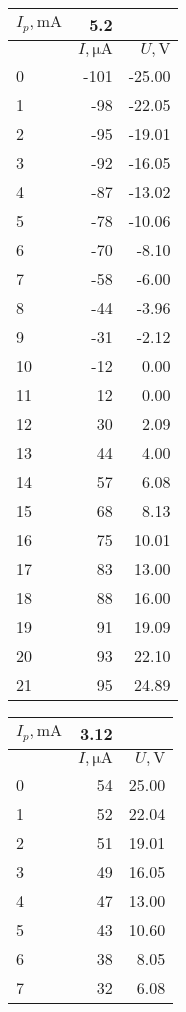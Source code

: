 \documentclass[12pt]{article}
\begin{document}
\begin{enumerate}
	\begin{tabular}{|l|r|r}
	\toprule
	$I_p, \si{\milli \ampere}$ & 5.2 & \\
    \toprule
    {} &         $I, \si{\micro \ampere}$ & $U, \si{\volt} $\\
    \midrule
    0  & -101 & -25.00 \\
    1  & -98 & -22.05 \\
    2  & -95 & -19.01 \\
    3  & -92 & -16.05 \\
    4  & -87 & -13.02 \\
    5  & -78 & -10.06 \\
    6  & -70 &  -8.10 \\
    7  & -58 &  -6.00 \\
    8  & -44 &  -3.96 \\
    9  & -31 &  -2.12 \\
    10 & -12 &   0.00 \\
    11 &  12 &   0.00 \\
    12 &  30 &   2.09 \\
    13 &  44 &   4.00 \\
    14 &  57 &   6.08 \\
    15 &  68 &   8.13 \\
    16 &  75 &  10.01 \\
    17 &  83 &  13.00 \\
    18 &  88 &  16.00 \\
    19 &  91 &  19.09 \\
    20 &  93 &  22.10 \\
    21 &  95 &  24.89 \\
    \bottomrule
    \end{tabular}
    \begin{tabular}{|l|r|r|}
    \toprule
    $I_p, \si{\milli \ampere}$ & 3.12 & \\
    \toprule
    {} &         $I, \si{\micro \ampere}$ & $U, \si{\volt} $\\
    \midrule
    0  &  54 &  25.00 \\
    1  &  52 &  22.04 \\
    2  &  51 &  19.01 \\
    3  &  49 &  16.05 \\
    4  &  47 &  13.00 \\
    5  &  43 &  10.60 \\
    6  &  38 &   8.05 \\
    7  &  32 &   6.08 \\

\end{tabular}
\end{enumerate}
\end{document}
